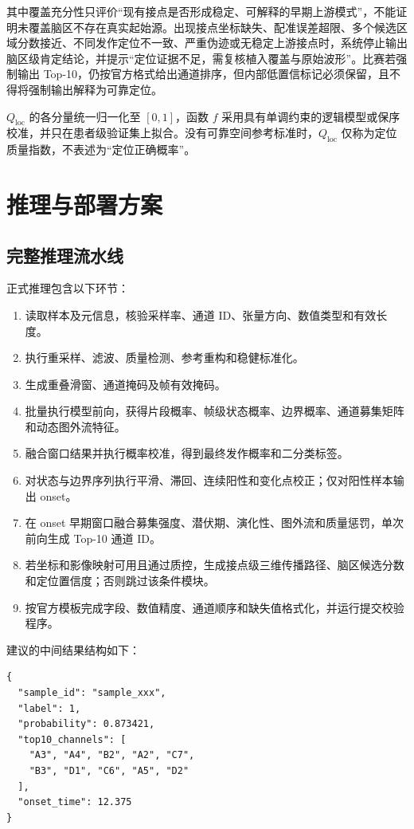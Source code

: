 其中覆盖充分性只评价“现有接点是否形成稳定、可解释的早期上游模式”，不能证明未覆盖脑区不存在真实起始源。出现接点坐标缺失、配准误差超限、多个候选区域分数接近、不同发作定位不一致、严重伪迹或无稳定上游接点时，系统停止输出脑区级肯定结论，并提示“定位证据不足，需复核植入覆盖与原始波形”。比赛若强制输出 Top-10，仍按官方格式给出通道排序，但内部低置信标记必须保留，且不得将强制输出解释为可靠定位。

$Q_{\mathrm{loc}}$ 的各分量统一归一化至 $[0,1]$，函数 $f$ 采用具有单调约束的逻辑模型或保序校准，并只在患者级验证集上拟合。没有可靠空间参考标准时，$Q_{\mathrm{loc}}$ 仅称为定位质量指数，不表述为“定位正确概率”。

\clearpage
\section{推理与部署方案}

\subsection{完整推理流水线}

正式推理包含以下环节：

\begin{enumerate}[leftmargin=2.6em,itemsep=0.2em]
    \item 读取样本及元信息，核验采样率、通道 ID、张量方向、数值类型和有效长度。
    \item 执行重采样、滤波、质量检测、参考重构和稳健标准化。
    \item 生成重叠滑窗、通道掩码及帧有效掩码。
    \item 批量执行模型前向，获得片段概率、帧级状态概率、边界概率、通道募集矩阵和动态图外流特征。
    \item 融合窗口结果并执行概率校准，得到最终发作概率和二分类标签。
    \item 对状态与边界序列执行平滑、滞回、连续阳性和变化点校正；仅对阳性样本输出 onset。
    \item 在 onset 早期窗口融合募集强度、潜伏期、演化性、图外流和质量惩罚，单次前向生成 Top-10 通道 ID。
    \item 若坐标和影像映射可用且通过质控，生成接点级三维传播路径、脑区候选分数和定位置信度；否则跳过该条件模块。
    \item 按官方模板完成字段、数值精度、通道顺序和缺失值格式化，并运行提交校验程序。
\end{enumerate}

建议的中间结果结构如下：

\begin{verbatim}
{
  "sample_id": "sample_xxx",
  "label": 1,
  "probability": 0.873421,
  "top10_channels": [
    "A3", "A4", "B2", "A2", "C7",
    "B3", "D1", "C6", "A5", "D2"
  ],
  "onset_time": 12.375
}
\end{verbatim}


